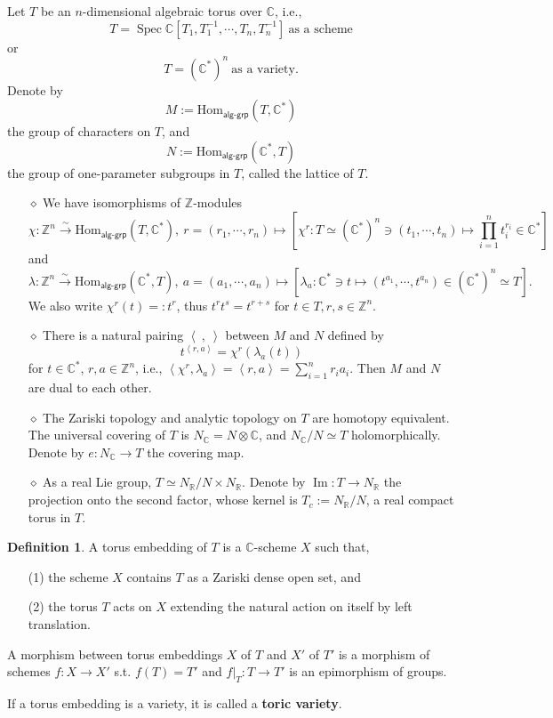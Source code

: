 \documentclass[11pt,english]{smfart}
\theoremstyle{definition}
\newtheorem{definition}{Definition}
\theoremstyle{remark}
\newcommand{\R}{\mathbb{R}}
\renewcommand{\C}{\mathbb{C}}
\newcommand{\Z}{\mathbb{Z}}
\DeclareMathOperator{\spec}{Spec} %
\newcommand{\isomto}{\stackrel{\sim}{\rightarrow}} %
\renewcommand{\hom}{\mathrm{Hom}}
\newcommand{\myit}{$\diamond$}
\renewcommand{\Im}{\mathop{\mathrm{Im}}}
\begin{document}
Let $T$ be an $n$-dimensional algebraic torus over $\C$, i.e., \[T = \spec\C[T_1, T_1^{-1}, \cdots, T_n, T_n^{-1}]\ \text{as a scheme}\] or \[T = (\C^*)^n\ \text{as a variety}.\]
Denote by \[M := \hom_{\mathsf{alg\text{-}grp}} (T, \C^*)\] the group of characters on $T$,
and\[N := \hom_{\mathsf{alg\text{-}grp}}(\C^*, T)\] the group of one-parameter subgroups in $T$, called the lattice of $T$.
\begin{enumerate}
    \item [\myit] We have isomorphisms of $\Z$-modules\[\chi: \Z^n\isomto \hom_{\mathsf{alg\text{-}grp}} (T, \C^*),\ r = (r_1, \cdots, r_n)\mapsto \left[\chi^r: T\simeq (\C^*)^n\ni (t_1, \cdots, t_n)\mapsto \prod_{i=1}^n t_i^{r_i}\in\C^*\right]\]
    and \[\lambda: \Z^n\isomto \hom_{\mathsf{alg\text{-}grp}} (\C^*, T),\ a = (a_1, \cdots, a_n)\mapsto [\lambda_a :\C^* \ni t\mapsto (t^{a_1}, \cdots, t^{a_n})\in (\C^*)^n\simeq T].\]
    We also write $\chi^r(t) =: t^r$, thus $t^{r}t^{s} = t^{r+s}$ for $t\in T, r, s\in\Z^n$.
    \item [\myit] There is a natural pairing $\left<\ ,\ \right>$ between $M$ and $N$ defined by \[t^{\left<r, a\right>} = \chi^r(\lambda_a(t))\]for $t\in\C^*$, $r, a\in\Z^n$, i.e., $\left<\chi^r, \lambda_a\right> = \left<r, a\right> = \sum_{i=1}^n r_ia_i$. Then $M$ and $N$ are dual to each other.
    \item [\myit] The Zariski topology and analytic topology on $T$ are homotopy equivalent. The universal covering of $T$ is $N_\C = N\otimes \C$, and $N_\C/N\simeq T$ holomorphically. Denote by $e: N_\C\to T$ the covering map.
    \item [\myit] As a real Lie group, $T\simeq N_\R/N\times N_\R$. Denote by $\Im: T\to N_\R$ the projection onto the second factor, whose kernel is $T_c:=N_\R/N$, a real compact torus in $T$.
\end{enumerate}

\begin{definition}
    A torus embedding of $T$ is a $\C$-scheme $X$ such that,\begin{enumerate}
        \item[(1)] the scheme $X$ contains $T$ as a Zariski dense open set, and
        \item[(2)] the torus $T$ acts on $X$ extending the natural action on itself by left translation.
    \end{enumerate}
    A morphism between torus embeddings $X$ of $T$ and $X'$ of $T'$ is a morphism of schemes $f: X\to X'$ s.t. $f(T) = T'$ and $f|_T:T\to T'$ is an epimorphism of groups.

    If a torus embedding is a variety, it is called a \textbf{toric variety}.
\end{definition}
\end{document}

